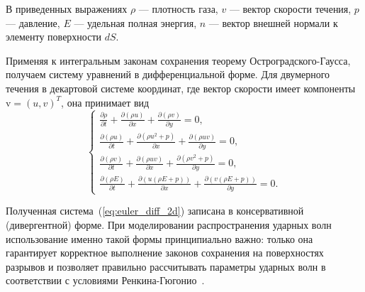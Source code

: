 \documentclass[a4paper,14pt]{extarticle}
\theoremstyle{theorem}
\theoremstyle{lemma}
\begin{document}
В приведенных выражениях $\rho$ — плотность газа, $v$ — вектор скорости течения, $p$ — давление, $E$ — удельная полная энергия, $n$ — вектор внешней нормали к элементу поверхности $dS$. 

Применяя к интегральным законам сохранения теорему Остроградского-Гаусса, получаем систему уравнений в дифференциальной форме. Для двумерного течения в декартовой системе координат, где вектор скорости имеет компоненты $\mathrm{v} = (u, v)^T$, она принимает вид
\begin{equation}
\label{eq:euler_diff_2d}
\begin{cases}
    \displaystyle \frac{\partial \rho}{\partial t} + \frac{\partial (\rho u)}{\partial x} + \frac{\partial (\rho v)}{\partial y} = 0, \\[10pt]
    \displaystyle \frac{\partial (\rho u)}{\partial t} + \frac{\partial (\rho u^2 + p)}{\partial x} + \frac{\partial (\rho u v)}{\partial y} = 0, \\[10pt]
    \displaystyle \frac{\partial (\rho v)}{\partial t} + \frac{\partial (\rho u v)}{\partial x} + \frac{\partial (\rho v^2 + p)}{\partial y} = 0, \\[10pt]
    \displaystyle \frac{\partial (\rho E)}{\partial t} + \frac{\partial \left(u(\rho E + p)\right)}{\partial x} + \frac{\partial \left(v(\rho E + p)\right)}{\partial y} = 0.
\end{cases}
\end{equation}
    
Полученная система~(\ref{eq:euler_diff_2d}) записана в консервативной (дивергентной) форме. При моделировании распространения ударных волн использование именно такой формы принципиально важно: только она гарантирует корректное выполнение законов сохранения на поверхностях разрывов и позволяет правильно рассчитывать параметры ударных волн в соответствии с условиями Ренкина-Гюгонио~\cite{godunov,leveque1992}.
\end{document}
